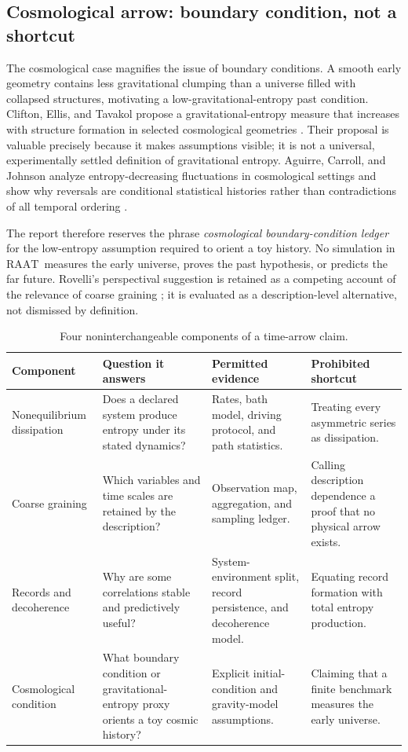\documentclass[conference]{../../../../Conference-LaTeX-template_10-17-19/IEEEtran}
\newcommand{\RAAT}{\ensuremath{\mathrm{RAAT}}}
\begin{document}
\subsection{Cosmological arrow: boundary condition, not a shortcut}

The cosmological case magnifies the issue of boundary conditions. A smooth early geometry contains less gravitational clumping than a universe filled with collapsed structures, motivating a low-gravitational-entropy past condition. Clifton, Ellis, and Tavakol propose a gravitational-entropy measure that increases with structure formation in selected cosmological geometries \cite{clifton_ellis_tavakol2013}. Their proposal is valuable precisely because it makes assumptions visible; it is not a universal, experimentally settled definition of gravitational entropy. Aguirre, Carroll, and Johnson analyze entropy-decreasing fluctuations in cosmological settings and show why reversals are conditional statistical histories rather than contradictions of all temporal ordering \cite{aguirre_carroll_johnson2012}.

The report therefore reserves the phrase \emph{cosmological boundary-condition ledger} for the low-entropy assumption required to orient a toy history. No simulation in \RAAT\ measures the early universe, proves the past hypothesis, or predicts the far future. Rovelli's perspectival suggestion is retained as a competing account of the relevance of coarse graining \cite{rovelli2017}; it is evaluated as a description-level alternative, not dismissed by definition.

\begin{table}[!t]
\caption{Four noninterchangeable components of a time-arrow claim.}
\label{tab:components}
\centering
\footnotesize
\begin{tabularx}{\textwidth}{p{}Y Y Y}
\toprule
\textbf{Component} & \textbf{Question it answers} & \textbf{Permitted evidence} & \textbf{Prohibited shortcut}\\
\midrule
Nonequilibrium dissipation & Does a declared system produce entropy under its stated dynamics? & Rates, bath model, driving protocol, and path statistics. & Treating every asymmetric series as dissipation.\\
Coarse graining & Which variables and time scales are retained by the description? & Observation map, aggregation, and sampling ledger. & Calling description dependence a proof that no physical arrow exists.\\
Records and decoherence & Why are some correlations stable and predictively useful? & System-environment split, record persistence, and decoherence model. & Equating record formation with total entropy production.\\
Cosmological condition & What boundary condition or gravitational-entropy proxy orients a toy cosmic history? & Explicit initial-condition and gravity-model assumptions. & Claiming that a finite benchmark measures the early universe.\\
\bottomrule
\end{tabularx}
\end{table}
\end{document}
